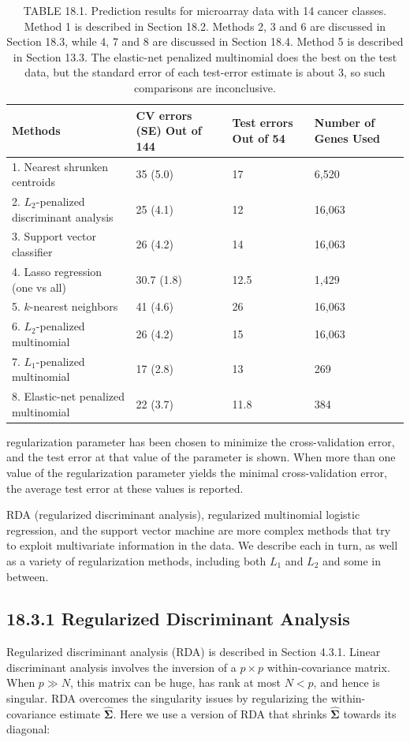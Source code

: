 \documentclass[10pt]{article}
\begin{document}
\begin{table}[h]
\begin{center}
\captionsetup{labelformat=empty}
\caption{TABLE 18.1. Prediction results for microarray data with 14 cancer classes. Method 1 is described in Section 18.2. Methods 2, 3 and 6 are discussed in Section 18.3, while 4, 7 and 8 are discussed in Section 18.4. Method 5 is described in Section 13.3. The elastic-net penalized multinomial does the best on the test data, but the standard error of each test-error estimate is about 3, so such comparisons are inconclusive.}
\begin{tabular}{|l|l|l|l|}
\hline
Methods & CV errors (SE) Out of 144 & Test errors Out of 54 & Number of Genes Used \\
\hline
1. Nearest shrunken centroids & 35 (5.0) & 17 & 6,520 \\
\hline
2. $L_{2}$-penalized discriminant analysis & 25 (4.1) & 12 & 16,063 \\
\hline
3. Support vector classifier & 26 (4.2) & 14 & 16,063 \\
\hline
4. Lasso regression (one vs all) & 30.7 (1.8) & 12.5 & 1,429 \\
\hline
5. $k$-nearest neighbors & 41 (4.6) & 26 & 16,063 \\
\hline
6. $L_{2}$-penalized multinomial & 26 (4.2) & 15 & 16,063 \\
\hline
7. $L_{1}$-penalized multinomial & 17 (2.8) & 13 & 269 \\
\hline
8. Elastic-net penalized multinomial & 22 (3.7) & 11.8 & 384 \\
\hline
\end{tabular}
\end{center}
\end{table}

regularization parameter has been chosen to minimize the cross-validation error, and the test error at that value of the parameter is shown. When more than one value of the regularization parameter yields the minimal cross-validation error, the average test error at these values is reported.

RDA (regularized discriminant analysis), regularized multinomial logistic regression, and the support vector machine are more complex methods that try to exploit multivariate information in the data. We describe each in turn, as well as a variety of regularization methods, including both $L_{1}$ and $L_{2}$ and some in between.

\subsection*{18.3.1 Regularized Discriminant Analysis}
Regularized discriminant analysis (RDA) is described in Section 4.3.1. Linear discriminant analysis involves the inversion of a $p \times p$ within-covariance matrix. When $p \gg N$, this matrix can be huge, has rank at most $N<p$, and hence is singular. RDA overcomes the singularity issues by regularizing the within-covariance estimate $\hat{\boldsymbol{\Sigma}}$. Here we use a version of RDA that shrinks $\hat{\boldsymbol{\Sigma}}$ towards its diagonal:
\end{document}
